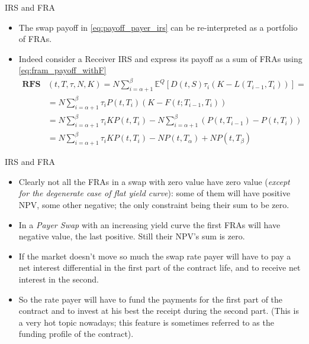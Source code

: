 \documentclass{beamer}
\begin{document}
\begin{frame}{IRS and FRA}
	\begin{itemize}
		\item The swap payoff in \cref{eq:payoff_payer_irs} can be re-interpreted as a portfolio of FRAs.
		\item Indeed consider a Receiver IRS and express its payoff as a sum of FRAs using \cref{eq:fram_payoff_withF}
		\begin{equation}
			\begin{aligned}
				\textbf{RFS}&(t,T,\tau,N,K) = 	N\sum_{i=\alpha+1}^{\beta}\mathbb{E}^Q[D(t,S)\tau_i(K - L(T_{i-1},T_i))]=\\
				&=N\sum_{i=\alpha+1}^{\beta}\tau_i P(t,T_i)(K-F(t;T_{i-1},T_i))\\
				&=N\sum_{i=\alpha+1}^{\beta}\tau_i KP(t,T_i)-N\sum_{i=\alpha+1}^{\beta}(P(t,T_{i-1})-P(t,T_i)) \\
				&=\boxed{N\sum_{i=\alpha+1}^{\beta}\tau_i KP(t,T_i)-NP(t,T_\alpha)+NP(t,T_\beta)}
			\end{aligned}
		\label{eq:swap_as_sum_fra}
		\end{equation}
	\end{itemize}
\end{frame}

\begin{frame}{IRS and FRA}
	\begin{itemize}
		\item<1-> Clearly not all the FRAs in a swap with zero value have zero value (\emph{except for the degenerate case of flat yield curve}): some of them will have positive NPV, some other negative; the only constraint being their sum to be zero.
		\item<2-> In a \emph{Payer Swap} with an increasing yield curve the first FRAs will have negative value, the last positive. Still their NPV's sum is zero.
		\item<3-> If the market doesn't move so much the swap rate payer will have to pay a net interest differential in the first part of the contract life, and to receive net interest in the second.
		\item<4-> So the rate payer will have to fund the payments for the first part of the contract and to invest at his best the receipt during the second part. (This is a very hot topic nowadays; this feature is sometimes referred to as the funding profile of the contract).
	\end{itemize}
\end{frame}
\end{document}
